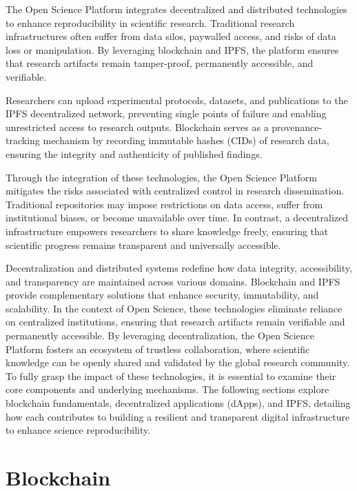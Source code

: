 \documentclass{article}
\begin{document}
The Open Science Platform integrates decentralized and distributed technologies to enhance reproducibility in scientific research. Traditional research infrastructures often suffer from data silos, paywalled access, and risks of data loss or manipulation. By leveraging blockchain and IPFS, the platform ensures that research artifacts remain tamper-proof, permanently accessible, and verifiable.

Researchers can upload experimental protocols, datasets, and publications to the IPFS decentralized network, preventing single points of failure and enabling unrestricted access to research outputs. Blockchain serves as a provenance-tracking mechanism by recording immutable hashes (CIDs) of research data, ensuring the integrity and authenticity of published findings.

Through the integration of these technologies, the Open Science Platform mitigates the risks associated with centralized control in research dissemination. Traditional repositories may impose restrictions on data access, suffer from institutional biases, or become unavailable over time. In contrast, a decentralized infrastructure empowers researchers to share knowledge freely, ensuring that scientific progress remains transparent and universally accessible.

Decentralization and distributed systems redefine how data integrity, accessibility, and transparency are maintained across various domains. Blockchain and IPFS provide complementary solutions that enhance security, immutability, and scalability. In the context of Open Science, these technologies eliminate reliance on centralized institutions, ensuring that research artifacts remain verifiable and permanently accessible. By leveraging decentralization, the Open Science Platform fosters an ecosystem of trustless collaboration, where scientific knowledge can be openly shared and validated by the global research community. To fully grasp the impact of these technologies, it is essential to examine their core components and underlying mechanisms. The following sections explore blockchain fundamentals, decentralized applications (dApps), and IPFS, detailing how each contributes to building a resilient and transparent digital infrastructure to enhance science reproducibility.


\section{Blockchain}
\end{document}
